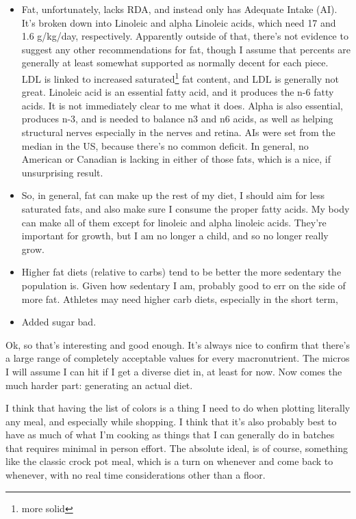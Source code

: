 \documentclass[12pt]{article}[titlepage]
\renewcommand{\,}{\textsuperscript{,}}
\begin{document}
\begin{itemize}
\item Fat, unfortunately, lacks RDA, and instead only has Adequate Intake (AI). It's broken down into Linoleic and alpha Linoleic acids, which need 17 and 1.6 g/kg/day, respectively. Apparently outside of that, there's not evidence to suggest any other recommendations for fat, though I assume that percents are generally at least somewhat supported as normally decent for each piece. LDL is linked to increased saturated\footnote{more solid} fat content, and LDL is generally not great. Linoleic acid is an essential fatty acid, and it produces the n-6 fatty acids. It is not immediately clear to me what it does. Alpha is also essential, produces n-3, and is needed to balance n3 and n6 acids, as well as helping structural nerves especially in the nerves and retina. AIs were set from the median in the US, because there's no common deficit. In general, no American or Canadian is lacking in either of those fats, which is a nice, if unsurprising result.  
\item So, in general, fat can make up the rest of my diet, I should aim for less saturated fats, and also make sure I consume the proper fatty acids. My body can make all of them except for linoleic and alpha linoleic acids. They're important for growth, but I am no longer a child, and so no longer really grow.  
\item Higher fat diets (relative to carbs) tend to be better the more sedentary the population is. Given how sedentary I am, probably good to err on the side of more fat. Athletes may need higher carb diets, especially in the short term,   
\item Added sugar bad.  
\end{itemize}

Ok, so that's interesting and good enough. It's always nice to confirm that there's a large range of completely acceptable values for every macronutrient. The micros I will assume I can hit if I get a diverse diet in, at least for now.  
Now comes the much harder part: generating an actual diet.

I think that having the list of colors is a thing I need to do when plotting literally any meal, and especially while shopping.  
I think that it's also probably best to have as much of what I'm cooking as things that I can generally do in batches that requires minimal in person effort.  
The absolute ideal, is of course, something like the classic crock pot meal, which is a turn on whenever and come back to whenever, with no real time considerations other than a floor.
\end{document}

